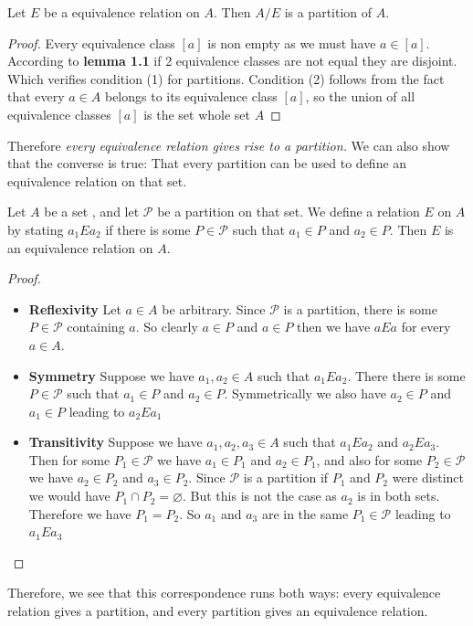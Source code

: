 \documentclass[16pt,a4paper]{article}
\theoremstyle{definition}
\begin{document}
\begin{thm}{}{}
Let $E$ be a equivalence relation on $A$. Then $A/E$ is a partition of $A$. 
\end{thm}
\begin{proof}
Every equivalence class $[a]$ is non empty as we must have $a \in [a]$. According to \textbf{lemma 1.1} if 2 equivalence classes are not equal they are disjoint. Which verifies condition (1) for partitions. Condition (2) follows from the fact that every $a\in A$ belongs to its equivalence class $[a]$, so the union of all equivalence classes $[a]$ is the set whole set $A$
\end{proof}
Therefore \emph{every equivalence relation gives rise to a partition.} We can also show that the converse is true: That every partition can be used to define an equivalence relation on that set. 
\newpage
\begin{thm}{}{}
Let $A$ be a set , and let $\mathcal{P}$ be a partition on that set. We define a relation $E$ on $A$ by stating $a_1 E a_2$ if there is some $P \in \mathcal{P}$ such that $a_1 \in P$ and $a_2 \in P$. Then $E$ is an equivalence relation on $A$. 
\end{thm}
\begin{proof}
$\;$\\
\begin{itemize}
\item \textbf{Reflexivity} Let $a\in A$ be arbitrary. Since $\mathcal{P}$ is a partition, there is some $P \in \mathcal{P}$ containing $a$. So clearly $a\in P$ and $a\in P$ then we have $aEa$ for every $a\in A$. 

\item \textbf{Symmetry} Suppose we have $a_1, a_2 \in A$ such that $a_1 E a_2$. There there is some $P \in \mathcal{P}$ such that $a_1 \in P$ and $a_2 \in P$. Symmetrically we also have $a_2 \in P$ and $a_1 \in P$ leading to $a_2 E a_1$

\item \textbf{Transitivity} Suppose we have $a_1, a_2, a_3 \in A$ such that $a_1Ea_2$ and $a_2Ea_3$. Then for some $P_1\in\mathcal{P}$ we have $a_1 \in P_1$ and $a_2 \in P_1$, and also for some $P_2 \in \mathcal{P}$ we have $a_2 \in P_2$ and $a_3 \in P_2$. Since $\mathcal{P}$ is a partition if $P_1$ and $P_2$ were distinct we would have $P_1 \cap P_2 = \varnothing$. But this is not the case as $a_2$ is in both sets. Therefore we have $P_1 = P_2$. So $a_1$ and $a_3$ are in the same $P_1 \in \mathcal{P}$ leading to $a_1 E a_3$ 

\end{itemize}
\end{proof} 
Therefore, we see that this correspondence runs both ways: every equivalence relation gives a partition, and every partition gives an equivalence relation.
\end{document}

